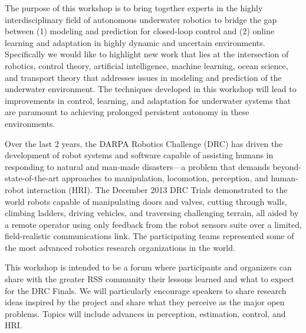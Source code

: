 \begin{spacing}{1.0}
{The purpose of this workshop is to bring together experts in the highly interdisciplinary field of autonomous underwater robotics to bridge the gap between (1) modeling and prediction for closed-loop control and (2) online learning and adaptation in highly dynamic and uncertain environments. Specifically we would like to highlight new work that lies at the intersection of robotics, control theory, artificial intelligence, machine learning, ocean science, and transport theory that addresses issues in modeling and prediction of the underwater environment. The techniques developed in this workshop will lead to improvements in control, learning, and adaptation for underwater systems that are paramount to achieving prolonged persistent autonomy in these environments. 

}


{
Over the last 2 years, the DARPA Robotics Challenge (DRC) has driven the development of robot systems and software capable of assisting humans in responding to natural and man-made disasters—a problem that demands beyond-state-of-the-art approaches to manipulation, locomotion, perception, and human-robot interaction (HRI). The December 2013 DRC Trials demonstrated to the world robots capable of manipulating doors and valves, cutting through walls, climbing ladders, driving vehicles, and traversing challenging terrain, all aided by a remote operator using only feedback from the robot sensors suite over a limited, field-realistic communications link. The participating teams represented some of the most advanced robotics research organizations in the world.

This workshop is intended to be a forum where participants and organizers can share with the greater RSS community their lessons learned and what to expect for the DRC Finals. We will particularly encourage speakers to share research ideas inspired by the project and share what they perceive as the major open problems. Topics will include advances in perception, estimation, control, and HRI.
}



\end{spacing}
